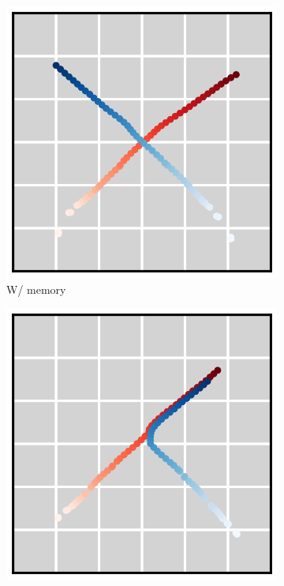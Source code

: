 \begin{figure}[h]
\begin{subfigure}[t]{.3\linewidth}
        \centering\includegraphics[width=\linewidth]{figures/w_memory.png}
        \caption{W/ memory} \label{fig:compositionality_w_memory}
    \end{subfigure}
    \begin{subfigure}[t]{.3\linewidth}
        \centering\includegraphics[width=\linewidth]{figures/wo_memory_v2.png}

\end{subfigure}
\end{figure}
